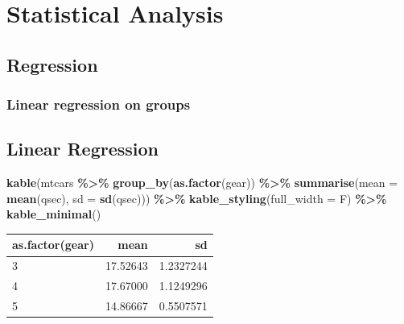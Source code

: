\documentclass[
]{article}
\newenvironment{Shaded}{\begin{snugshade}}{\end{snugshade}}
\newcommand{\AttributeTok}[1]{\textcolor[rgb]{0.13,0.29,0.53}{#1}}
\newcommand{\FunctionTok}[1]{\textcolor[rgb]{0.13,0.29,0.53}{\textbf{#1}}}
\newcommand{\NormalTok}[1]{#1}
\newcommand{\SpecialCharTok}[1]{\textcolor[rgb]{0.81,0.36,0.00}{\textbf{#1}}}
\begin{document}
\hypertarget{statistical-analysis}{%
\section{Statistical Analysis}\label{statistical-analysis}}

\hypertarget{regression}{%
\subsection{Regression}\label{regression}}

\hypertarget{linear-regression-on-groups}{%
\subsubsection{Linear regression on groups}\label{linear-regression-on-groups}}

\hypertarget{linear-regression}{%
\subsection{Linear Regression}\label{linear-regression}}

\begin{Shaded}
\begin{Highlighting}[]
\FunctionTok{kable}\NormalTok{(mtcars }\SpecialCharTok{\%\textgreater{}\%}  \FunctionTok{group\_by}\NormalTok{(}\FunctionTok{as.factor}\NormalTok{(gear)) }\SpecialCharTok{\%\textgreater{}\%}
\FunctionTok{summarise}\NormalTok{(}\AttributeTok{mean =} \FunctionTok{mean}\NormalTok{(qsec), }\AttributeTok{sd =} \FunctionTok{sd}\NormalTok{(qsec))) }\SpecialCharTok{\%\textgreater{}\%}
  \FunctionTok{kable\_styling}\NormalTok{(}\AttributeTok{full\_width =}\NormalTok{ F) }\SpecialCharTok{\%\textgreater{}\%}
  \FunctionTok{kable\_minimal}\NormalTok{()}
\end{Highlighting}
\end{Shaded}

\begin{table}
\centering
\begin{tabular}{l|r|r}
\hline
as.factor(gear) & mean & sd\\
\hline
3 & 17.52643 & 1.2327244\\
\hline
4 & 17.67000 & 1.1249296\\
\hline
5 & 14.86667 & 0.5507571\\
\hline
\end{tabular}
\end{table}
\end{document}
